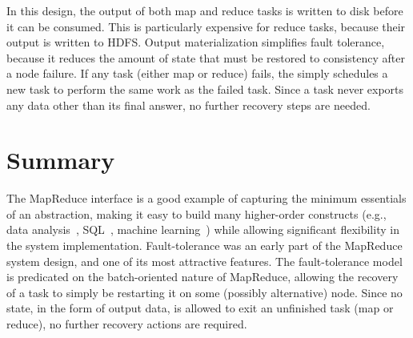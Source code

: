 In this design, the output of both map and reduce tasks is written to disk
before it can be consumed. This is particularly expensive for reduce tasks,
because their output is written to HDFS\@. Output materialization simplifies
fault tolerance, because it reduces the amount of state that must be restored to
consistency after a node failure. If any task (either map or reduce) fails, the
{\JT} simply schedules a new task to perform the same work as the failed
task. Since a task never exports any data other than its final answer, no
further recovery steps are needed.






\section{Summary}
\label{ch:hadoop:sec:conclude}

The MapReduce interface is a good example of capturing the minimum essentials
of an abstraction, making it easy to build many higher-order constructs (e.g.,
data analysis~\cite{pig-sigmod}, SQL~\cite{hive-vldb}, machine
learning~\cite{mahout}) while allowing significant flexibility in the system
implementation.  Fault-tolerance was an early part of the MapReduce system
design, and one of its most attractive features.  The fault-tolerance model is
predicated on the batch-oriented nature of MapReduce, allowing the recovery of
a task to simply be restarting it on some (possibly alternative) node.  Since
no state, in the form of output data, is allowed to exit an unfinished task
(map or reduce), no further recovery actions are required.

